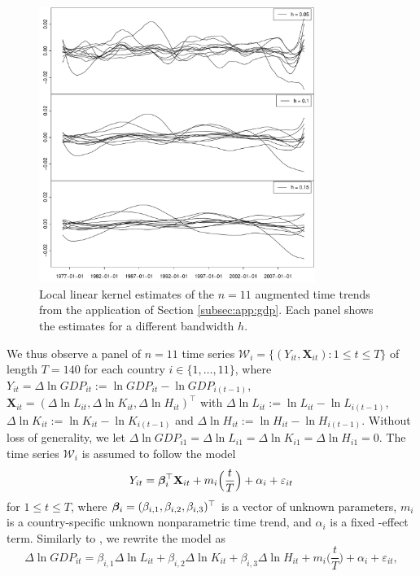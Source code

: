 \documentclass[a4paper,12pt]{article}
\makeatletter
\renewcommand{\eqref}[1]{\tagform@{\ref{#1}}}
\makeatother
\begin{document}
{\begin{figure}[t]
\centering
\includegraphics[width=0.8\textwidth]{Plots/smoothed_gdp_data_augmented.pdf}
\vspace{0.2cm}
\caption{Local linear kernel estimates of the $n=11$ augmented time trends from the application of Section \ref{subsec:app:gdp}. Each panel shows the estimates for a different bandwidth $h$.}\label{plot:app:gdp_augm}
\end{figure}


We thus observe a panel of $n = 11$ time series $\mathcal{W}_i = \{(Y_{it}, \mathbf{X}_{it}): 1 \le t \le T \}$ of length $T = 140$ for each country $i \in \{1,\ldots,11\}$, where $Y_{it} = \Delta \ln GDP_{it} := \ln GDP_{it} - \ln GDP_{i(t-1)}$, $\mathbf{X}_{it} = (\Delta \ln L_{it}, \Delta \ln K_{it}, \Delta \ln H_{it})^\top$ with $\Delta \ln L_{it} := \ln L_{it} - \ln L_{i(t-1)}$, $\Delta \ln K_{it} := \ln K_{it} - \ln K_{i(t-1)}$ and $\Delta \ln H_{it} := \ln H_{it} - \ln H_{i(t-1)}$. Without loss of generality, we let $\Delta \ln GDP_{i1} = \Delta \ln L_{i1} = \Delta \ln K_{i1} = \Delta \ln H_{i1} = 0$. The time series $\mathcal{W}_i$ is assumed to follow the model 
\begin{equation}\label{eq:model:app}
Y_{it} = \bm{\beta}^\top_i \mathbf{X}_{it} + m_i \Big( \frac{t}{T} \Big) + \alpha_i + \varepsilon_{it} 
\end{equation}
for $1 \le t \le T$, where $\bm{\beta}_i = (\beta_{i, 1}, \beta_{i, 2}, \beta_{i, 3})^\top$ is a vector of unknown parameters, $m_i$ is a country-specific unknown nonparametric time trend, and $\alpha_i$ is a fixed -effect term. Similarly to \cite{Zhang2012}, we rewrite the model \eqref{eq:model:app} as
\begin{equation}\label{eq:model:app2}
\Delta \ln GDP_{it} = \beta_{i, 1} \Delta \ln L_{it} + \beta_{i, 2} \Delta \ln K_{it} + \beta_{i, 3} \Delta \ln H_{it} + m_i \Big( \frac{t}{T} \Big) + \alpha_i + \varepsilon_{it},
\end{equation}

}
\end{document}
